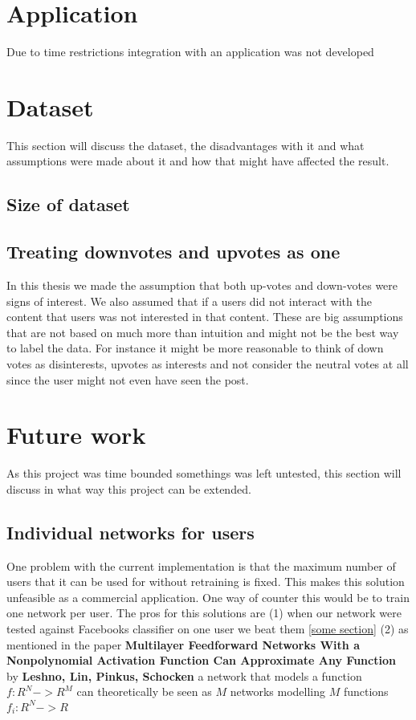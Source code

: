 \section{Application}
Due to time restrictions integration with an application was not developed
\section{Dataset}
This section will discuss the dataset, the disadvantages with it and what assumptions were made about it and how that might have affected the result.
\subsection{Size of dataset}
\subsection{Treating downvotes and upvotes as one}
In this thesis we made the assumption that both up-votes and down-votes were signs of interest. We also assumed that if a users did not interact with the content that users was not interested in that content. These are big assumptions that are not based on much more than intuition and might not be the best way to label the data. For instance it might be more reasonable to think of down votes as disinterests, upvotes as interests and not consider the neutral votes at all since the user might not even have seen the post. 
\section{Future work}
As this project was time bounded somethings was left untested, this section will discuss in what way this project can be extended.

\subsection{Individual networks for users}
One problem with the current implementation is that the maximum number of users that it can be used for without retraining is fixed. This makes this solution unfeasible as a commercial application. One way of counter this would be to train one network per user.
The pros for this solutions are (1) when our network were tested against Facebooks classifier on one user we beat them \ref{some section} (2) as mentioned in the paper \textbf{Multilayer Feedforward Networks With a Nonpolynomial Activation Function Can Approximate Any Function} by \textbf{Leshno, Lin, Pinkus, Schocken} a network that models a function $f:R^N->R^M$ can theoretically be seen as $M$ networks modelling $M$ functions $f_i:R^N->R$ \parencite{leshno1993multilayer} 

